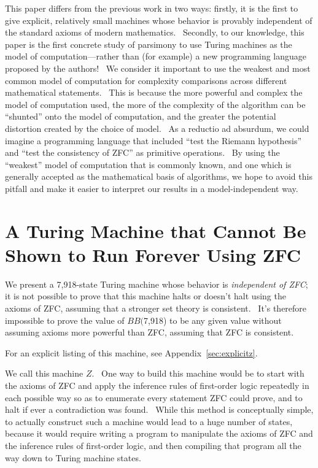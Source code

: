 \documentclass[11pt]{article}
\newcommand{\statenumstate}{7,918-state }
\newcommand{\bbstatenum}{$BB($7,918) }
\begin{document}
This paper differs from the previous work in two ways: firstly, it is the first to give explicit, relatively small machines whose behavior is provably independent of the standard axioms of modern mathematics. \ Secondly, to our knowledge, this paper is the first concrete study of parsimony to use Turing machines as the model of computation---rather than (for example) a new programming language proposed by the authors! \ We consider it important to use the weakest and most common model of computation for complexity comparisons across different mathematical statements. \ This is because the more powerful and complex the model of computation used, the more of the complexity of the algorithm can be ``shunted'' onto the model of computation, and the greater the potential distortion created by the choice of model. \ As a reductio ad absurdum, we could imagine a programming language that included ``test the Riemann hypothesis'' and ``test the consistency of ZFC'' as primitive operations. \ By using the ``weakest'' model of computation that is commonly known, and one which is generally accepted as the mathematical basis of algorithms, we hope to avoid this pitfall and make it easier to interpret our results in a model-independent way.

\section{A Turing Machine that Cannot Be Shown to Run Forever Using ZFC}

We present a \statenumstate Turing machine whose behavior is \emph{independent of ZFC}; it is not possible to prove that this machine halts or doesn't halt using the axioms of ZFC, assuming that a stronger set theory is consistent. \ It's therefore impossible to prove the value of \bbstatenum to be any given value without assuming axioms more powerful than ZFC, assuming that ZFC is consistent.

For an explicit listing of this machine, see Appendix~\ref{sec:explicitz}.

We call this machine $Z$. \ One way to build this machine would be to start with the axioms of ZFC and apply the inference rules of first-order logic repeatedly in each possible way so as to enumerate every statement ZFC could prove, and to halt if ever a contradiction was found. \ While this method is conceptually simple, to actually construct such a machine would lead to a huge number of states, because it would require writing a program to manipulate the axioms of ZFC and the inference rules of first-order logic, and then compiling that program all the way down to Turing machine states.
\end{document}
